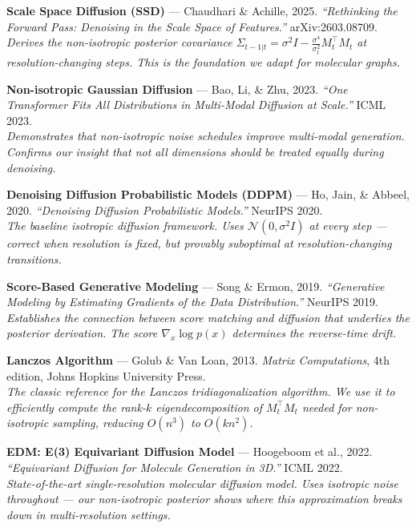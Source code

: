 \documentclass[12pt,a4paper]{article}
\begin{document}
\begin{enumerate}[leftmargin=*, label={[\arabic*]}]

\item \textbf{Scale Space Diffusion (SSD)} --- Chaudhari \& Achille, 2025.
\textit{``Rethinking the Forward Pass: Denoising in the Scale Space of Features.''}
arXiv:2603.08709.\\
\emph{Derives the non-isotropic posterior covariance $\Sigma_{t-1|t} = \sigma^2 I - \frac{\sigma^4}{\sigma_t^2} M_t^\top M_t$ at resolution-changing steps. This is the foundation we adapt for molecular graphs.}

\item \textbf{Non-isotropic Gaussian Diffusion} --- Bao, Li, \& Zhu, 2023.
\textit{``One Transformer Fits All Distributions in Multi-Modal Diffusion at Scale.''}
ICML 2023.\\
\emph{Demonstrates that non-isotropic noise schedules improve multi-modal generation. Confirms our insight that not all dimensions should be treated equally during denoising.}

\item \textbf{Denoising Diffusion Probabilistic Models (DDPM)} --- Ho, Jain, \& Abbeel, 2020.
\textit{``Denoising Diffusion Probabilistic Models.''}
NeurIPS 2020.\\
\emph{The baseline isotropic diffusion framework. Uses $\mathcal{N}(0, \sigma^2 I)$ at every step --- correct when resolution is fixed, but provably suboptimal at resolution-changing transitions.}

\item \textbf{Score-Based Generative Modeling} --- Song \& Ermon, 2019.
\textit{``Generative Modeling by Estimating Gradients of the Data Distribution.''}
NeurIPS 2019.\\
\emph{Establishes the connection between score matching and diffusion that underlies the posterior derivation. The score $\nabla_x \log p(x)$ determines the reverse-time drift.}

\item \textbf{Lanczos Algorithm} --- Golub \& Van Loan, 2013.
\textit{Matrix Computations}, 4th edition, Johns Hopkins University Press.\\
\emph{The classic reference for the Lanczos tridiagonalization algorithm. We use it to efficiently compute the rank-$k$ eigendecomposition of $M_t^\top M_t$ needed for non-isotropic sampling, reducing $O(n^3)$ to $O(kn^2)$.}

\item \textbf{EDM: E(3) Equivariant Diffusion Model} --- Hoogeboom et al., 2022.
\textit{``Equivariant Diffusion for Molecule Generation in 3D.''}
ICML 2022.\\
\emph{State-of-the-art single-resolution molecular diffusion model. Uses isotropic noise throughout --- our non-isotropic posterior shows where this approximation breaks down in multi-resolution settings.}


\end{enumerate}
\end{document}
